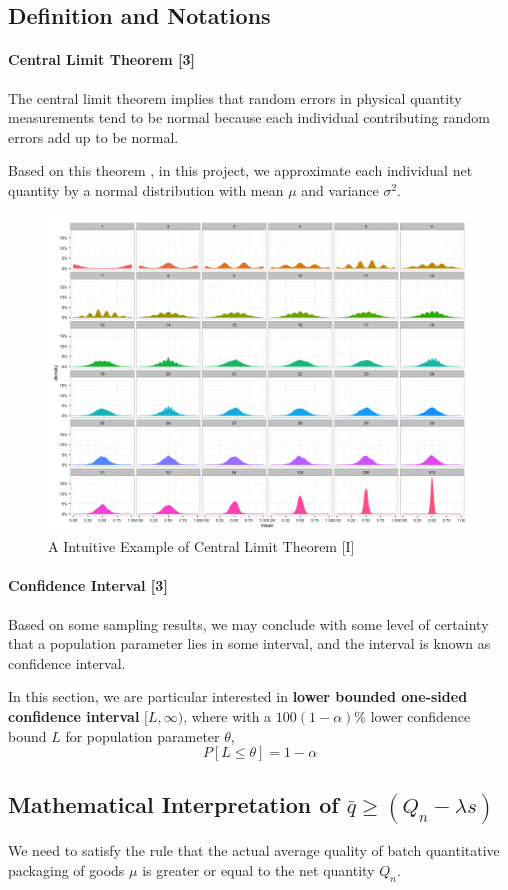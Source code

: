 \documentclass[a4paper]{article}
\begin{document}
\subsection{Definition and Notations}
\paragraph{Central Limit Theorem [3]}
The central limit theorem implies that random errors in physical quantity measurements tend to be normal because each individual contributing random errors add up to be normal.

Based on this theorem , in this project, we approximate each individual net quantity by a normal distribution with mean $\mu$ and variance $\sigma^2$. 

\begin{figure}[!htbp] 
\centering 
\includegraphics[width=0.8\linewidth]{clt.png}  
\caption{A Intuitive Example of Central Limit Theorem [I]} 
\label{fig1}
\end{figure}

\paragraph{Confidence Interval [3]}
Based on some sampling results, we may conclude with some level of certainty that a population parameter lies in some interval, and the interval is known as confidence interval.

In this section, we are particular interested in \textbf{lower bounded one-sided confidence interval} $[L,\infty)$, where with a $100(1-\alpha)\%$ lower confidence bound $L$ for population parameter $\theta$,
$$P[L\leq \theta] = 1-\alpha$$
\subsection{Mathematical Interpretation of $\bar{q}\geq (Q_n-\lambda s)$}
We need to satisfy the rule that the actual average quality of batch quantitative packaging of goods $\mu$ is greater or equal to the net quantity $Q_n$.
\end{document}
